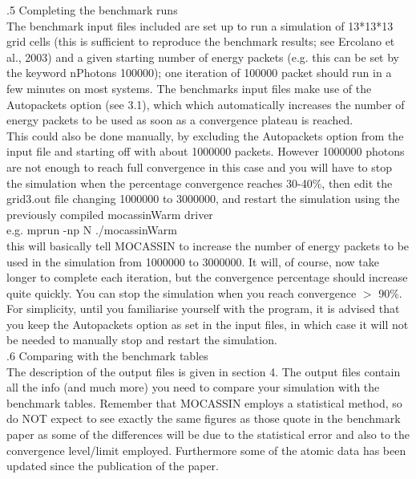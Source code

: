 \documentclass[11pt]{article}
\begin{document}
.5 Completing the benchmark runs\\
        The benchmark input files included are set up to run a simulation of 
        13*13*13 grid cells (this is sufficient to reproduce the benchmark results; see 
        Ercolano et al., 2003) and a given starting number of energy packets 	
        (e.g. this can be set by the keyword nPhotons 100000); 
        one iteration of 100000 packet should run in a few minutes on most systems.	
        The benchmarks input files make use of the Autopackets option (see 3.1), which 
        which automatically increases the number of energy packets to be used as soon as
        a convergence plateau is reached. \\
        This could also be done manually, by excluding the Autopackets option from the input 
        file and starting off with about 1000000 packets.
        However 1000000 photons are not enough to reach full convergence in this case 
        and you will have to stop the simulation when the percentage convergence reaches 
        30-40\%, then edit the grid3.out file changing 1000000 to 3000000, and restart the 
        simulation using the previously compiled mocassinWarm driver \\
\indent  e.g. mprun -np N ./mocassinWarm\\
\noindent        this will basically tell MOCASSIN to increase the number of energy packets 
        to be used in the simulation from 1000000 to 3000000. It will, of course, 
        now take longer to complete each iteration, but the convergence percentage 
        should increase quite quickly. You can stop the simulation when you reach 
        convergence $>$ 90\%. 
        For simplicity, until you familiarise yourself with the program, it is advised 
        that you keep the Autopackets option as set in the input files, 
        in which case it will not be needed to manually stop and restart the simulation.\\

.6 Comparing with the benchmark tables\\
        The description of the output files is given in section 4. The output files
	contain all the info (and much more) you need to compare your simulation with 
        the benchmark tables. Remember that MOCASSIN employs a statistical method, so
        do NOT expect to see exactly the same figures as those quote in the benchmark
        paper as some of the differences will be due to the statistical error and also 
        to the convergence level/limit employed. Furthermore some of the atomic data
        has been updated since the publication of the paper. \\
\end{document}
